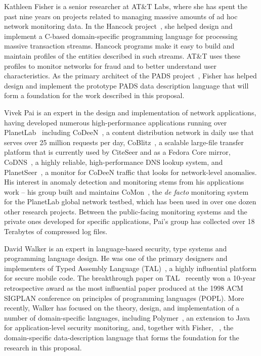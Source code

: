 \documentclass[12pt]{article}
\begin{document}
Kathleen Fisher is a senior researcher at AT\&T Labs,
where she has spent the past nine years on projects
related to managing massive amounts of ad hoc network monitoring data.
In the Hancock project~\cite{kdd00,hancock-toplas}, she helped 
design and implement a C-based
domain-specific programming language for processing massive  
transaction streams.  Hancock programs make it easy to build
and maintain profiles of the entities described in such streams. 
AT\&T uses these profiles to monitor networks for fraud 
and to better understand user characteristics.
As the primary architect of the PADS project~\cite{fisher+:pads,fisher+:popl06,daly+:pads-demo,mandelbaum+:pads-ml}, 
Fisher has helped design and implement the prototype PADS
data description language that will form a foundation for the work
described in this proposal.  

Vivek Pai is an expert in the design and implementation of network
applications, having developed numerous high-performance applications
running over PlanetLab~\cite{planetlab} including
CoDeeN~\cite{PaiDark, wang02osdi, codeen04}, a content distribution network in daily use that
serves over 25 million requests per day, CoBlitz~\cite{coblitzbw, codeploy04, coblitz}, a
scalable large-file transfer platform that is currently used by
CiteSeer and as a Fedora Core mirror, CoDNS~\cite{codns}, a highly
reliable, high-performance DNS lookup system, and
PlanetSeer~\cite{Zhang_OSDI_2004}, a monitor for CoDeeN traffic that looks
for network-level anomalies.  His interest in anomaly detection and
monitoring stems from his applications work -- his group built and
maintains CoMon~\cite{CoMon}, the {\it de facto} monitoring system for the
PlanetLab global network testbed, which has been used in over one
dozen other research projects. Between the public-facing monitoring
systems and the private ones developed for specific applications, Pai's
group has collected over 18 Terabytes of compressed log files.

David Walker is an expert in language-based security,
type systems and programming language design.
He was one of the primary designers 
and implementers
of Typed Assembly Language (TAL)~\cite{morrisett+:journal-stal,morrisett+:tal-popl,morrisett+:tal}, 
a highly influential platform
for secure mobile code.  The breakthrough paper on 
TAL~\cite{morrisett+:tal-popl} recently won a 10-year retrospective
award as the most influential paper produced at the 1998 ACM SIGPLAN conference
on principles of programming languages (POPL).  More recently, Walker
has focused on the theory, design, and implementation of a number of
domain-specific languages, including
Polymer~\cite{bauer+:polymer,ligatti+:edit-automata,ligatti+:renewal}, an
extension to Java for application-level security monitoring, and,
together with Fisher, \pads{}~\cite{daly+:pads-demo,fisher+:pads,fisher+:popl06,mandelbaum+:pads-ml}, the domain-specific data-description language that forms 
the foundation for the research in this proposal.
\end{document}
